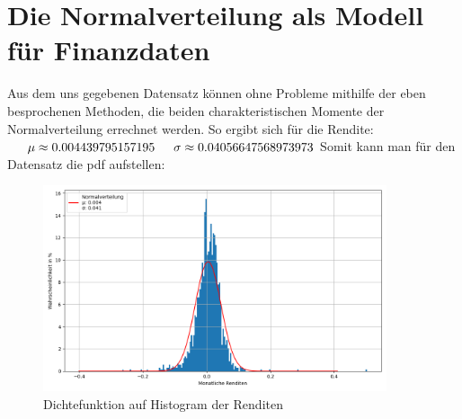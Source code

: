 \documentclass[12pt, a4paper]{report}
\theoremstyle{definition}
\begin{document}
\section{Die Normalverteilung als Modell für Finanzdaten}
Aus dem uns gegebenen Datensatz können ohne Probleme mithilfe der eben besprochenen Methoden, die beiden charakteristischen Momente der Normalverteilung errechnet werden. So ergibt sich für die Rendite: \\%
$
\indent \mu  \approx 0.004439795157195 \\
\indent \sigma \approx 0.04056647568973973 \\
$
Somit kann man für den Datensatz die pdf aufstellen:
\begin{figure}[htbp]
  \centering
     \includegraphics[width=0.9\textwidth]{bilder/N_on_returns.png}
  \caption{Dichtefunktion auf Histogram der Renditen}
  \label{fig:Abb.2}
\end{figure}
\end{document}
